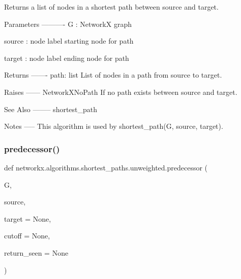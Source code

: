 \begin{DoxyVerb}Returns a list of nodes in a shortest path between source and target.

Parameters
----------
G : NetworkX graph

source : node label
   starting node for path

target : node label
   ending node for path

Returns
-------
path: list
   List of nodes in a path from source to target.

Raises
------
NetworkXNoPath
   If no path exists between source and target.

See Also
--------
shortest_path

Notes
-----
This algorithm is used by shortest_path(G, source, target).
\end{DoxyVerb}
 \mbox{\label{namespacenetworkx_1_1algorithms_1_1shortest__paths_1_1unweighted_a7d99327e99d49d8179e7b60fd48740a7}} 
\subsubsection{\texorpdfstring{predecessor()}{predecessor()}}
{\footnotesize\ttfamily def networkx.\+algorithms.\+shortest\+\_\+paths.\+unweighted.\+predecessor (\begin{DoxyParamCaption}\item[{}]{G,  }\item[{}]{source,  }\item[{}]{target = {\ttfamily None},  }\item[{}]{cutoff = {\ttfamily None},  }\item[{}]{return\+\_\+seen = {\ttfamily None} }\end{DoxyParamCaption})}

